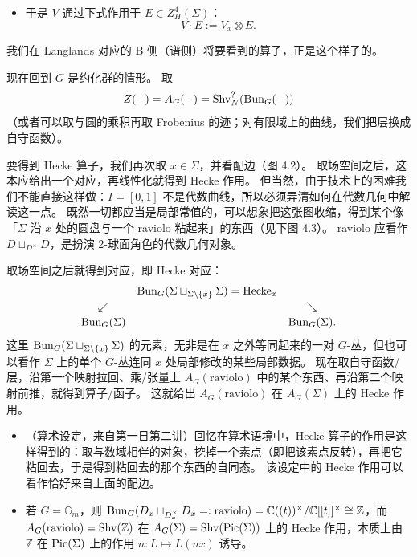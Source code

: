 \begin{itemize}[leftmargin=2.0em,itemsep=0.3em]
\item 于是 $V$ 通过下式作用于 $E\in Z^4_H(\Sigma)$：
\[
  V\cdot E:=V_x\otimes E.
\]
\end{itemize}

我们在 Langlands 对应的 B 侧（谱侧）将要看到的算子，正是这个样子的。

现在回到 $G$ 是约化群的情形。
取
\[
  Z(-)=A_G(-)=\operatorname{Shv}^?_N(\operatorname{Bun}_G(-))
\]
（或者可以取与圆的乘积再取 Frobenius 的迹；对有限域上的曲线，我们把层换成自守函数）。

要得到 Hecke 算子，我们再次取 $x\in\Sigma$，并看配边（图 4.2）。
取场空间之后，这本应给出一个对应，再线性化就得到 Hecke 作用。
但当然，由于技术上的困难我们不能直接这样做：$I=[0,1]$ 不是代数曲线，所以必须弄清如何在代数几何中解读这一点。
既然一切都应当是局部常值的，可以想象把这张图收缩，得到某个像「$\Sigma$ 沿 $x$ 处的圆盘与一个 raviolo 粘起来」的东西（见下图 4.3）。
raviolo 应看作 $D\sqcup_{D^\times}D$，是扮演 2-球面角色的代数几何对象。

取场空间之后就得到对应，即 Hecke 对应：
\[
\begin{array}{ccc}
& \operatorname{Bun}_G(\Sigma\sqcup_{\Sigma\setminus\{x\}}\Sigma)=\mathrm{Hecke}_x &\\[2pt]
\swarrow & & \searrow\\[2pt]
\operatorname{Bun}_G(\Sigma) & & \operatorname{Bun}_G(\Sigma).
\end{array}
\]
这里 $\operatorname{Bun}_G(\Sigma\sqcup_{\Sigma\setminus\{x\}}\Sigma)$ 的元素，无非是在 $x$ 之外等同起来的一对 $G$-丛，但也可以看作 $\Sigma$ 上的单个 $G$-丛连同 $x$ 处局部修改的某些局部数据。
现在取自守函数/层，沿第一个映射拉回、乘/张量上 $A_G(\text{raviolo})$ 中的某个东西、再沿第二个映射前推，就得到算子/函子。
这就给出 $A_G(\text{raviolo})$ 在 $A_G(\Sigma)$ 上的 Hecke 作用。

\begin{exmp}
\leavevmode\par
\begin{itemize}[leftmargin=2.0em,itemsep=0.3em]
\item （算术设定，来自第一日第二讲）回忆在算术语境中，Hecke 算子的作用是这样得到的：取与数域相伴的对象，挖掉一个素点（即把该素点反转），再把它粘回去，于是得到粘回去的那个东西的自同态。
该设定中的 Hecke 作用可以看作恰好来自上面的配边。
\item 若 $G=\mathbb G_m$，则 $\operatorname{Bun}_G(D_x\sqcup_{D^\times_x}D_x=:\text{raviolo})=\mathbb C((t))^\times/\mathbb C[[t]]^\times\cong\mathbb Z$，而 $A_G(\text{raviolo})=\operatorname{Shv}(\mathbb Z)$ 在 $A_G(\Sigma)=\operatorname{Shv}(\operatorname{Pic}(\Sigma))$ 上的 Hecke 作用，本质上由 $\mathbb Z$ 在 $\operatorname{Pic}(\Sigma)$ 上的作用 $n:L\mapsto L(nx)$ 诱导。
\end{itemize}
\end{exmp}
